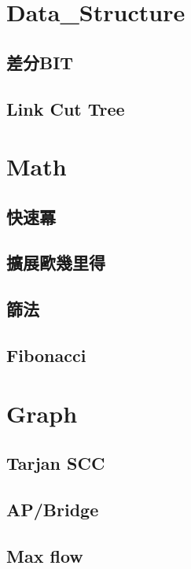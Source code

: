 \section{Data_Structure}
\subsection*{差分BIT}

\subsection{Link Cut Tree}


\section{Math}
\subsection{快速冪} 

\subsection{擴展歐幾里得}

\subsection*{篩法}

\subsection*{Fibonacci}


\section{Graph}
\subsection{Tarjan SCC} 

\subsection{AP/Bridge} 

\subsection{Max flow} 

